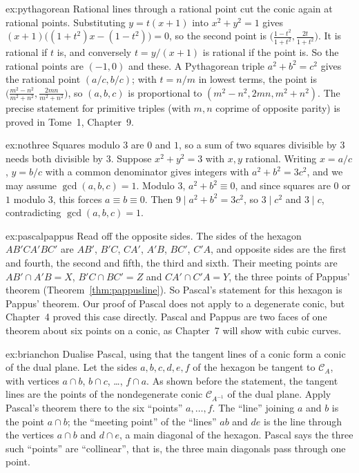\begin{solution}{ex:pythagorean}
\idea Rational lines through a rational point cut the conic again at rational points.
\writeup Substituting $y=t(x+1)$ into $x^2+y^2=1$ gives $(x+1)\bigl((1+t^2)x-(1-t^2)\bigr)=0$, so the second point is
$\bigl(\frac{1-t^2}{1+t^2},\frac{2t}{1+t^2}\bigr)$. It is rational if $t$ is, and conversely $t=y/(x+1)$ is rational if the point is. So the rational points
are $(-1,0)$ and these. A Pythagorean triple $a^2+b^2=c^2$ gives the rational point $(a/c,b/c)$; with $t=n/m$ in lowest terms, the point is
$\bigl(\frac{m^2-n^2}{m^2+n^2},\frac{2mn}{m^2+n^2}\bigr)$, so $(a,b,c)$ is proportional to $(m^2-n^2,2mn,m^2+n^2)$. The precise statement for primitive
triples (with $m,n$ coprime of opposite parity) is proved in Tome~1, Chapter~9.
\end{solution}

\begin{solution}{ex:nothree}
\idea Squares modulo $3$ are $0$ and $1$, so a sum of two squares divisible by $3$ needs both divisible by $3$.
\writeup Suppose $x^2+y^2=3$ with $x,y$ rational. Writing $x=a/c$, $y=b/c$ with a common denominator gives integers with $a^2+b^2=3c^2$, and we may assume
$\gcd(a,b,c)=1$. Modulo $3$, $a^2+b^2\equiv0$, and since squares are $0$ or $1$ modulo $3$, this forces $a\equiv b\equiv0$. Then $9\mid a^2+b^2=3c^2$,
so $3\mid c^2$ and $3\mid c$, contradicting $\gcd(a,b,c)=1$.
\end{solution}

\begin{solution}{ex:pascalpappus}
\idea Read off the opposite sides.
\writeup The sides of the hexagon $AB'CA'BC'$ are $AB'$, $B'C$, $CA'$, $A'B$, $BC'$, $C'A$, and opposite sides are the first and fourth, the second and fifth,
the third and sixth. Their meeting points are $AB'\cap A'B=X$, $B'C\cap BC'=Z$ and $CA'\cap C'A=Y$, the three points of Pappus' theorem (Theorem~\ref{thm:pappusline}).
So Pascal's statement for this hexagon is Pappus' theorem. Our proof of Pascal does not apply to a degenerate conic, but Chapter~4 proved this case
directly. Pascal and Pappus are two faces of one theorem about six points on a conic, as Chapter~7 will show with cubic curves.
\end{solution}

\begin{solution}{ex:brianchon}
\idea Dualise Pascal, using that the tangent lines of a conic form a conic of the dual plane.
\writeup Let the sides $a,b,c,d,e,f$ of the hexagon be tangent to $\mathcal C_A$, with vertices $a\cap b$, $b\cap c$, \dots, $f\cap a$. As shown before the
statement, the tangent lines are the points of the nondegenerate conic $\mathcal C_{A^{-1}}$ of the dual plane. Apply Pascal's theorem there to the
six ``points'' $a,\dots,f$. The ``line'' joining $a$ and $b$ is the point $a\cap b$; the ``meeting point'' of the ``lines'' $ab$ and $de$ is the line
through the vertices $a\cap b$ and $d\cap e$, a main diagonal of the hexagon. Pascal says the three such ``points'' are ``collinear'', that is, the
three main diagonals pass through one point.
\end{solution}

